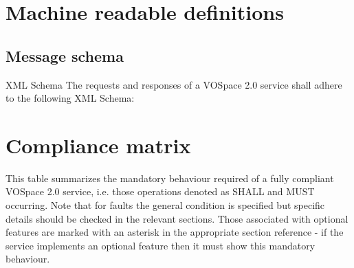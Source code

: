 \documentclass[11pt,a4paper]{ivoa}
\begin{document}
\appendix

\section{Machine readable definitions}
\label{sec:machine readable definitions}
\subsection{Message schema}
\label{subsec:message schema}
XML Schema
The requests and responses of a VOSpace 2.0 service shall adhere to the following XML Schema:



\section{Compliance matrix}
\label{sec:compliance matrix}
This table summarizes the mandatory behaviour required of a fully compliant VOSpace 2.0 service, i.e. those operations denoted as SHALL and MUST occurring. Note that for faults the general condition is specified but specific details should be checked in the relevant sections. Those associated with optional features are marked with an asterisk in the appropriate section reference - if the service implements an optional feature then it must show this mandatory behaviour.
\end{document}
